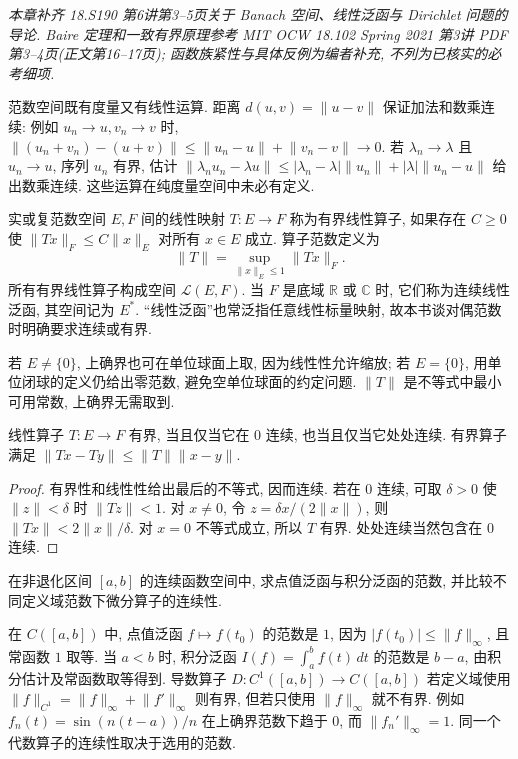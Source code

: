 \label{ch:function-spaces}
\emph{本章补齐 18.S190 第6讲第3--5页关于 Banach 空间、线性泛函与 Dirichlet 问题的导论. Baire 定理和一致有界原理参考 MIT OCW 18.102 Spring 2021 第3讲 PDF 第3--4页(正文第16--17页); 函数族紧性与具体反例为编者补充, 不列为已核实的必考细项.}

范数空间既有度量又有线性运算. 距离 $d(u,v)=\lVert u-v\rVert$ 保证加法和数乘连续: 例如 $u_n\to u,v_n\to v$ 时,
$\lVert(u_n+v_n)-(u+v)\rVert\le\lVert u_n-u\rVert+\lVert v_n-v\rVert\to0$.
若 $\lambda_n\to\lambda$ 且 $u_n\to u$, 序列 $u_n$ 有界, 估计
$\lVert\lambda_nu_n-\lambda u\rVert\le |\lambda_n-\lambda|\lVert u_n\rVert+|\lambda|\lVert u_n-u\rVert$ 给出数乘连续. 这些运算在纯度量空间中未必有定义.

\begin{definition}
实或复范数空间 $E,F$ 间的线性映射 $T:E\to F$ 称为有界线性算子, 如果存在 $C\ge0$ 使 $\lVert Tx\rVert_F\le C\lVert x\rVert_E$ 对所有 $x\in E$ 成立. 算子范数定义为
\[
 \lVert T\rVert=\sup_{\lVert x\rVert_E\le1}\lVert Tx\rVert_F.
\]
所有有界线性算子构成空间 $\mathcal L(E,F)$. 当 $F$ 是底域 $\mathbb R$ 或 $\mathbb C$ 时, 它们称为连续线性泛函, 其空间记为 $E^*$. “线性泛函”也常泛指任意线性标量映射, 故本书谈对偶范数时明确要求连续或有界.
\end{definition}
若 $E\ne\{0\}$, 上确界也可在单位球面上取, 因为线性性允许缩放; 若 $E=\{0\}$, 用单位闭球的定义仍给出零范数, 避免空单位球面的约定问题. $\lVert T\rVert$ 是不等式中最小可用常数, 上确界无需取到.

\begin{proposition}
线性算子 $T:E\to F$ 有界, 当且仅当它在 $0$ 连续, 也当且仅当它处处连续. 有界算子满足 $\lVert Tx-Ty\rVert\le\lVert T\rVert\lVert x-y\rVert$.
\end{proposition}
\begin{proof}
有界性和线性性给出最后的不等式, 因而连续. 若在 $0$ 连续, 可取 $\delta>0$ 使 $\lVert z\rVert<\delta$ 时 $\lVert Tz\rVert<1$. 对 $x\ne0$, 令 $z=\delta x/(2\lVert x\rVert)$, 则 $\lVert Tx\rVert<2\lVert x\rVert/\delta$. 对 $x=0$ 不等式成立, 所以 $T$ 有界. 处处连续当然包含在 $0$ 连续.
\end{proof}

\begin{example}
在非退化区间 $[a,b]$ 的连续函数空间中, 求点值泛函与积分泛函的范数, 并比较不同定义域范数下微分算子的连续性.
\end{example}
\begin{solution}
在 $C([a,b])$ 中, 点值泛函 $f\mapsto f(t_0)$ 的范数是 $1$, 因为 $|f(t_0)|\le\lVert f\rVert_\infty$, 且常函数 $1$ 取等. 当 $a<b$ 时, 积分泛函 $I(f)=\int_a^b f(t)\,dt$ 的范数是 $b-a$, 由积分估计及常函数取等得到. 导数算子 $D:C^1([a,b])\to C([a,b])$ 若定义域使用 $\lVert f\rVert_{C^1}=\lVert f\rVert_\infty+\lVert f'\rVert_\infty$ 则有界, 但若只使用 $\lVert f\rVert_\infty$ 就不有界. 例如 $f_n(t)=\sin(n(t-a))/n$ 在上确界范数下趋于 $0$, 而 $\lVert f_n'\rVert_\infty=1$. 同一个代数算子的连续性取决于选用的范数.
\end{solution}

